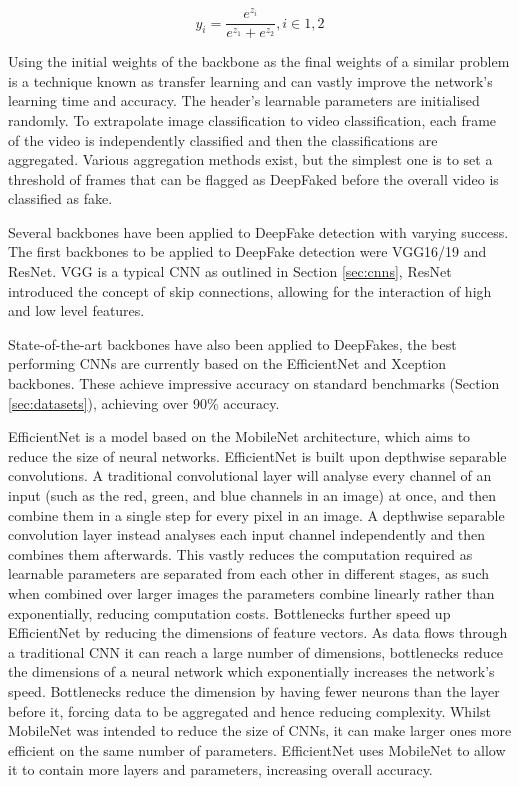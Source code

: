 \begin{equation}
    \label{eq:softmax}
    y_i=\frac{e^{z_i}}{e^{z_1} + e^{z_2}}, i\in1,2
\end{equation}

Using the initial weights of the backbone as the final weights of a similar problem is a technique known as transfer learning\cite{bozinovski1976influence} and can vastly improve the network's learning time and accuracy. The header's learnable parameters are initialised randomly. To extrapolate image classification to video classification, each frame of the video is independently classified and then the classifications are aggregated. Various aggregation methods exist, but the simplest one is to set a threshold of frames that can be flagged as DeepFaked before the overall video is classified as fake.

Several backbones have been applied to DeepFake detection with varying success\cite{thing2023deepfake}. The first backbones to be applied to DeepFake detection were VGG16/19\cite{simonyan2014very} and ResNet\cite{he2016deep}. VGG is a typical CNN as outlined in Section \ref{sec:cnns}, ResNet introduced the concept of skip connections, allowing for the interaction of high and low level features. 

State-of-the-art backbones have also been applied to DeepFakes, the best performing CNNs are currently based on the EfficientNet\cite{tan2019efficientnet} and Xception\cite{chollet2017xception} backbones. These achieve impressive accuracy on standard benchmarks (Section \ref{sec:datasets}), achieving over 90\% accuracy\cite{bonettini2021video}.

EfficientNet is a model based on the MobileNet\cite{howard2017mobilenets} architecture, which aims to reduce the size of neural networks. EfficientNet is built upon depthwise separable convolutions. A traditional convolutional layer will analyse every channel of an input (such as the red, green, and blue channels in an image) at once, and then combine them in a single step for every pixel in an image. A depthwise separable convolution layer instead analyses each input channel independently and then combines them afterwards. This vastly reduces the computation required as learnable parameters are separated from each other in different stages, as such when combined over larger images the parameters combine linearly rather than exponentially, reducing computation costs. Bottlenecks further speed up EfficientNet by reducing the dimensions of feature vectors. As data flows through a traditional CNN it can reach a large number of dimensions, bottlenecks reduce the dimensions of a neural network which exponentially increases the network's speed. Bottlenecks reduce the dimension by having fewer neurons than the layer before it, forcing data to be aggregated and hence reducing complexity. Whilst MobileNet was intended to reduce the size of CNNs, it can make larger ones more efficient on the same number of parameters. EfficientNet uses MobileNet to allow it to contain more layers and parameters, increasing overall accuracy.

